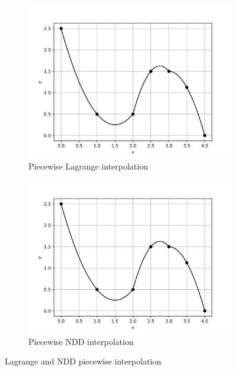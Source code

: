 \documentclass[12,a4paper]{article}
\begin{document}
    \begin{figure}[h!]
        \centering
        \begin{subfigure}[t]{0.49\textwidth}
            \includegraphics[width=\textwidth]{plots/q5b.png}
            \caption{Piecewise Lagrange interpolation}
            \label{fig:q5b}
        \end{subfigure}
        \begin{subfigure}[t]{0.49\textwidth}
            \includegraphics[width=\textwidth]{plots/q5b.png}
            \caption{Piecewise NDD interpolation}
            \label{fig:q5b2}
        \end{subfigure}
        \caption{Lagrange and NDD piecewise interpolation}
    \end{figure}
   
\end{document}
